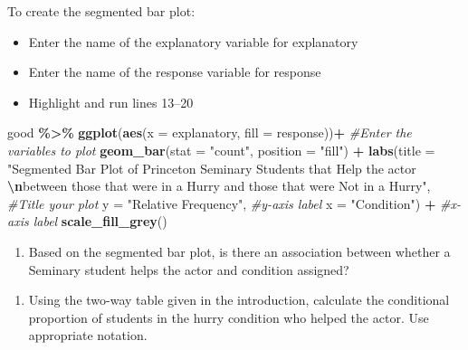 \documentclass[
]{report}
\newenvironment{Shaded}{\begin{snugshade}}{\end{snugshade}}
\newcommand{\AttributeTok}[1]{\textcolor[rgb]{0.13,0.29,0.53}{#1}}
\newcommand{\CommentTok}[1]{\textcolor[rgb]{0.56,0.35,0.01}{\textit{#1}}}
\newcommand{\FunctionTok}[1]{\textcolor[rgb]{0.13,0.29,0.53}{\textbf{#1}}}
\newcommand{\NormalTok}[1]{#1}
\newcommand{\SpecialCharTok}[1]{\textcolor[rgb]{0.81,0.36,0.00}{\textbf{#1}}}
\newcommand{\StringTok}[1]{\textcolor[rgb]{0.31,0.60,0.02}{#1}}
\providecommand{\tightlist}{%
  \setlength{\itemsep}{0pt}\setlength{\parskip}{0pt}}
\begin{document}
To create the segmented bar plot:

\begin{itemize}
\item
  Enter the name of the explanatory variable for explanatory
\item
  Enter the name of the response variable for response
\item
  Highlight and run lines 13--20
\end{itemize}

\begin{Shaded}
\begin{Highlighting}[]
\NormalTok{good }\SpecialCharTok{\%\textgreater{}\%}
  \FunctionTok{ggplot}\NormalTok{(}\FunctionTok{aes}\NormalTok{(}\AttributeTok{x =}\NormalTok{ explanatory, }\AttributeTok{fill =}\NormalTok{ response))}\SpecialCharTok{+} \CommentTok{\#Enter the variables to plot}
  \FunctionTok{geom\_bar}\NormalTok{(}\AttributeTok{stat =} \StringTok{"count"}\NormalTok{, }\AttributeTok{position =} \StringTok{"fill"}\NormalTok{) }\SpecialCharTok{+}
  \FunctionTok{labs}\NormalTok{(}\AttributeTok{title =} \StringTok{"Segmented Bar Plot of Princeton Seminary Students that Help the actor }\SpecialCharTok{\textbackslash{}n}\StringTok{between those that were in a Hurry and those that were Not in a Hurry"}\NormalTok{,  }\CommentTok{\#Title your plot}
       \AttributeTok{y =} \StringTok{"Relative Frequency"}\NormalTok{, }\CommentTok{\#y{-}axis label}
       \AttributeTok{x =} \StringTok{"Condition"}\NormalTok{) }\SpecialCharTok{+} \CommentTok{\#x{-}axis label}
  \FunctionTok{scale\_fill\_grey}\NormalTok{()}
\end{Highlighting}
\end{Shaded}

\begin{enumerate}
\def\labelenumi{\arabic{enumi}.}
\setcounter{enumi}{2}
\tightlist
\item
  Based on the segmented bar plot, is there an association between whether a Seminary student helps the actor and condition assigned?
\end{enumerate}

\vspace{0.4in}

\begin{enumerate}
\def\labelenumi{\arabic{enumi}.}
\setcounter{enumi}{3}
\tightlist
\item
  Using the two-way table given in the introduction, calculate the conditional proportion of students in the hurry condition who helped the actor. Use appropriate notation.
\end{enumerate}
\end{document}

